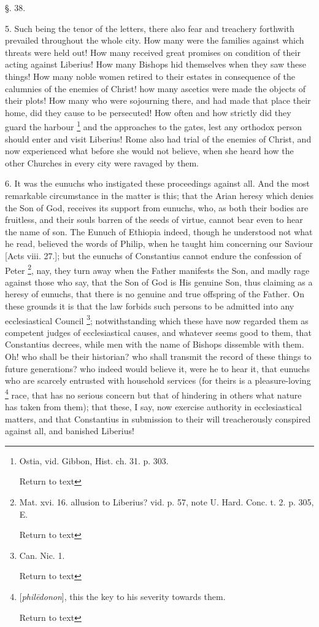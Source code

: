 §. 38.

5. Such being the tenor of the letters, there
also fear and treachery forthwith prevailed throughout the whole city.
How many were the families against which threats were held out! How
many received great promises on condition of their acting against
Liberius! How many Bishops hid themselves when they saw these things!
How many noble women retired to their estates in consequence of the
calumnies of the enemies of Christ! how many ascetics were made the
objects of their plots! How many who were sojourning there, and had
made that place their home, did they cause to be persecuted! How often
and how strictly did they guard the harbour \footnote{Ostia, vid. Gibbon, Hist. ch. 31. p. 303.

Return to text} and the approaches to the gates, lest any orthodox person should
enter and visit Liberius! Rome also had trial of the enemies of
Christ, and now experienced what before she would not believe, when
she heard how the other Churches in every city were ravaged by them.

6. It was the eunuchs who instigated these
proceedings against all. And the most remarkable circumstance in the
matter is this; that the Arian heresy which denies the Son of God,
receives its support from eunuchs, who, as both their bodies are
fruitless, and their souls barren of the seeds of virtue, cannot bear
even to hear the name of son. The Eunuch of Ethiopia indeed, though he
understood not what he read, believed the words of Philip, when he
taught him concerning our Saviour [Acts viii. 27.]; but the eunuchs of
Constantius cannot endure the confession of Peter \footnote{Mat. xvi. 16. allusion to Liberius? vid. p. 57, note U. Hard. Conc. t.
2. p. 305, E.

Return to text}, nay, they turn away when the Father manifests the Son, and madly
rage against those who say, that the Son of God is His genuine Son,
thus claiming as a heresy of eunuchs, that there is no genuine and
true offspring of the Father. On these grounds it is that the law
forbids such persons to be admitted into any ecclesiastical Council \footnote{Can. Nic. 1.

Return to text}; notwithstanding which these have now regarded them as competent
judges of ecclesiastical causes, and whatever seems good to
them, that Constantius decrees, while men with the name of Bishops
dissemble with them. Oh! who shall be their historian? who shall
transmit the record of these things to future generations? who indeed
would believe it, were he to hear it, that eunuchs who are scarcely
entrusted with household services (for theirs is a pleasure-loving \footnote{[\emph{phil\={e}donon}], this the key to his severity towards them.

Return to text} race, that has no serious concern but that of hindering in others
what nature has taken from them); that these, I say, now exercise
authority in ecclesiastical matters, and that Constantius in
submission to their will treacherously conspired against all, and
banished Liberius!

